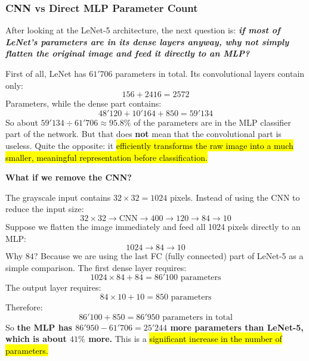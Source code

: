 \subsubsection{CNN vs Direct MLP Parameter Count}\label{sec:cnn-vs-direct-mlp-parameter-count}

After looking at the LeNet-5 architecture, the next question is: \emph{\textbf{if most of LeNet's parameters are in its dense layers anyway, why not simply flatten the original image and feed it directly to an MLP?}}

\highspace
First of all, LeNet has $61'706$ parameters in total. Its convolutional layers contain only:
\begin{equation*}
    156+2416=2572
\end{equation*}
Parameters, while the dense part contains:
\begin{equation*}
    48'120 + 10'164 + 850 = 59'134
\end{equation*}
So about $59'134 \div 61'706 \approx 95.8\%$ of the parameters are in the MLP classifier part of the network. But that does \textbf{not} mean that the convolutional part is useless. Quite the opposite: it \hl{efficiently transforms the raw image into a much smaller, meaningful representation before classification.}

\highspace
\begin{flushleft}
    \textcolor{Green3}{ \textbf{What if we remove the CNN?}}
\end{flushleft}
The grayscale input contains $32 \times 32 = 1024$ pixels. Instead of using the CNN to reduce the input size:
\begin{equation*}
    32 \times 32 \to \text{CNN} \to 400 \to 120 \to 84 \to 10
\end{equation*}
Suppose we flatten the image immediately and feed all 1024 pixels directly to an MLP:
\begin{equation*}
    1024\rightarrow84\rightarrow10
\end{equation*}
Why $84$? Because we are using the last FC (fully connected) part of LeNet-5 as a simple comparison. The first dense layer requires:
\begin{equation*}
    1024 \times 84 + 84 = 86'100 \text{ parameters}
\end{equation*}
The output layer requires:
\begin{equation*}
    84 \times 10 + 10 = 850 \text{ parameters}
\end{equation*}
Therefore:
\begin{equation*}
    86'100 + 850 = 86'950 \text{ parameters in total}
\end{equation*}
So \textbf{the MLP has $86'950 - 61'706 = 25'244$ more parameters than LeNet-5, which is about $41\%$ more.} This is a \hl{significant increase in the number of parameters.}

